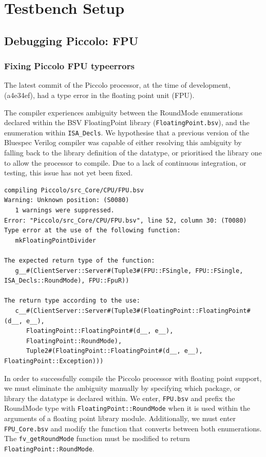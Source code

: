 \documentclass[a4paper,8pt]{report}
\begin{document}
\section{Testbench Setup}
\subsection{Debugging Piccolo: FPU}
\subsubsection{Fixing Piccolo FPU typeerrors}
The latest commit of the Piccolo processor, at the time of development, (a4e34ef), had
a type error in the floating point unit (FPU). 

The compiler experiences ambiguity between the RoundMode enumerations declared
within the BSV FloatingPoint library (\texttt{FloatingPoint.bsv}), and the
enumeration within \texttt{ISA\_Decls}. We hypothesise that a previous version
of the Bluespec Verilog compiler was capable of either resolving this ambiguity
by falling back to the library definition of the datatype, or prioritised the
library one to allow the processor to compile. Due to a lack of continuous
integration, or testing, this issue has not yet been fixed.

\begin{verbatim}
compiling Piccolo/src_Core/CPU/FPU.bsv
Warning: Unknown position: (S0080)
   1 warnings were suppressed.
Error: "Piccolo/src_Core/CPU/FPU.bsv", line 52, column 30: (T0080)
Type error at the use of the following function:
   mkFloatingPointDivider

The expected return type of the function:
   g__#(ClientServer::Server#(Tuple3#(FPU::FSingle, FPU::FSingle, ISA_Decls::RoundMode), FPU::FpuR))

The return type according to the use:
   c__#(ClientServer::Server#(Tuple3#(FloatingPoint::FloatingPoint#(d__, e__),
      FloatingPoint::FloatingPoint#(d__, e__),
      FloatingPoint::RoundMode),
      Tuple2#(FloatingPoint::FloatingPoint#(d__, e__), FloatingPoint::Exception)))
\end{verbatim}

In order to successfully compile the Piccolo processor with floating point
support, we must eliminate the ambiguity manually by specifying which package,
or library the datatype is declared within. We enter, \texttt{FPU.bsv} and prefix the
RoundMode type with \texttt{FloatingPoint::RoundMode} when it is used within the
arguments of a floating point library module. Additionally, we must enter
\texttt{FPU\_Core.bsv} and modify the function that converts between both
enumerations. The \texttt{fv\_getRoundMode} function must be modified to return
\texttt{FloatingPoint::RoundMode}.
\end{document}
